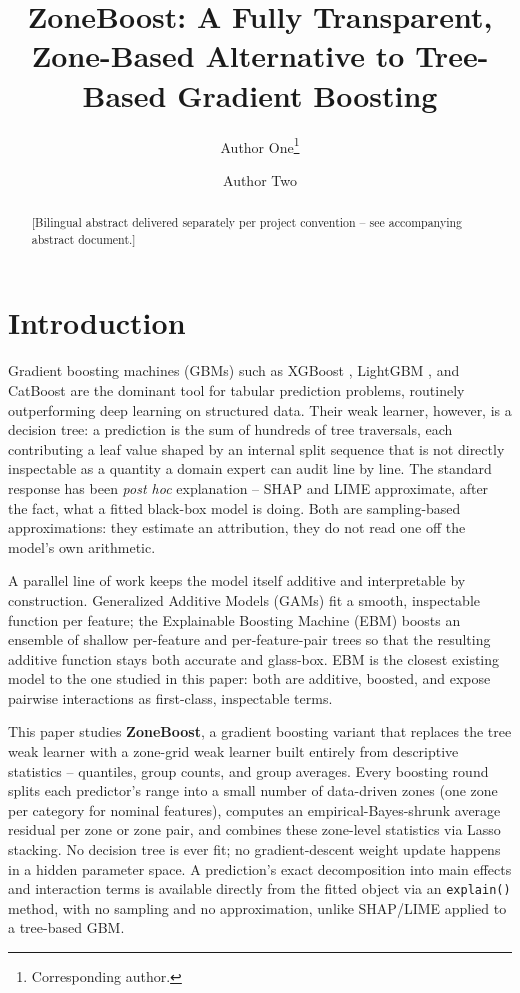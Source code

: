 \documentclass[11pt]{article}
\title{ZoneBoost: A Fully Transparent, Zone-Based Alternative to Tree-Based Gradient Boosting}
\author[1]{Author One\thanks{Corresponding author.}}
\author[2]{Author Two}
\affil[1]{[Affiliation to be filled in]}
\affil[2]{[Affiliation to be filled in]}
\date{}
\begin{document}
\maketitle

\begin{abstract}
[Bilingual abstract delivered separately per project convention -- see accompanying abstract document.]
\end{abstract}

\section{Introduction}
\label{sec:intro}

Gradient boosting machines (GBMs) such as XGBoost \citep{chen2016xgboost}, LightGBM
\citep{ke2017lightgbm}, and CatBoost \citep{prokhorenkova2018catboost} are the
dominant tool for tabular prediction problems, routinely outperforming deep
learning on structured data. Their weak learner, however, is a decision tree:
a prediction is the sum of hundreds of tree traversals, each contributing a
leaf value shaped by an internal split sequence that is not directly
inspectable as a quantity a domain expert can audit line by line. The
standard response has been \emph{post hoc} explanation -- SHAP
\citep{lundberg2017shap} and LIME \citep{ribeiro2016lime} approximate, after
the fact, what a fitted black-box model is doing. Both are sampling-based
approximations: they estimate an attribution, they do not read one off the
model's own arithmetic.

A parallel line of work keeps the model itself additive and interpretable by
construction. Generalized Additive Models (GAMs) \citep{hastie1986gam} fit a
smooth, inspectable function per feature; the Explainable Boosting Machine
(EBM) \citep{lou2013ga2m,nori2019interpretml} boosts an ensemble of shallow
per-feature and per-feature-pair trees so that the resulting additive
function stays both accurate and glass-box. EBM is the closest existing model
to the one studied in this paper: both are additive, boosted, and expose
pairwise interactions as first-class, inspectable terms.

This paper studies \textbf{ZoneBoost}, a gradient boosting variant that
replaces the tree weak learner with a zone-grid weak learner built entirely
from descriptive statistics -- quantiles, group counts, and group averages.
Every boosting round splits each predictor's range into a small number of
data-driven zones (one zone per category for nominal features), computes an
empirical-Bayes-shrunk average residual per zone or zone pair, and combines
these zone-level statistics via Lasso stacking. No decision tree is ever fit;
no gradient-descent weight update happens in a hidden parameter space. A
prediction's exact decomposition into main effects and interaction terms is
available directly from the fitted object via an \texttt{explain()} method,
with no sampling and no approximation, unlike SHAP/LIME applied to a
tree-based GBM.
\end{document}
